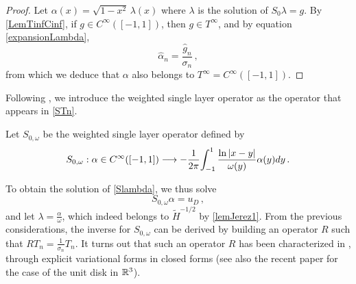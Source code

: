 \documentclass[a4paper]{subfiles}
\begin{document}
\begin{proof}
	Let $\alpha (x)= \sqrt{1 - x^2}\,\lambda(x)$ where $\lambda$ is the solution of $S_0\lambda = g$.  
	By \autoref{LemTinfCinf}, if $g \in C^{\infty}([-1,1])$, then $g \in T^{\infty}$, and by equation 
	\eqref{expansionLambda}, 
	\[ \hat{\alpha}_n = \frac{\hat{g}_n}{\sigma_n}\,,\]
		from which we deduce that $\alpha$ also  belongs to $T^{\infty} = C^{\infty}([-1,1])$. 
\end{proof}

\noindent Following \cite{bruno2012second}, we introduce the weighted single layer operator as the operator 
that appears in \autoref{STn}.
\begin{definition}
	Let $S_{0,\omega}$ be the weighted single layer operator defined by
	\[S_{0,\omega} : \alpha \in C^{\infty}([-1,1]) \longrightarrow -\dfrac{1}{2\pi}{\int_{-1}^1\dfrac{\ln|x-y|}{\omega(y)} \alpha(y)dy}\,.\]
\end{definition}
\noindent To obtain the solution of \eqref{Slambda}, we thus solve 
\begin{equation}
	S_{0,\omega} \alpha = u_D\,,
	\label{Somegaalpha}
\end{equation}
and let $\lambda = \frac{\alpha}{\omega}$, which indeed belongs to $\tilde{H}^{-1/2}$ by \eqref{lemJerez1}. From the previous 
considerations, the inverse for $S_{0,\omega}$ can be derived by building an operator $R$ such that $RT_n = \frac{1}{\sigma_n}T_n$. 
It turns out that such an operator $R$ has been characterized in \cite{jerez2012explicit,urzua2014optimal}, through explicit 
variational forms in closed forms (see also the recent paper \cite{hiptmair2017closed}  
for the case of the unit disk in $\mathbb{R}^3$). 
\end{document}
